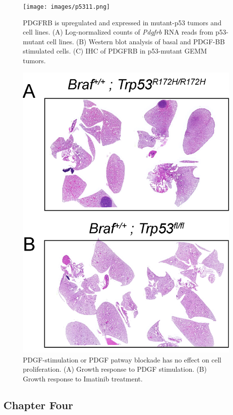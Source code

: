 \begin{figure}
\hypertarget{fig:04}{%
\centering
\texttt{[image: images/p5311.png]}
\caption{PDGFRB is upregulated and expressed in mutant-p53 tumors and cell lines. (A) Log-normalized counts of \emph{Pdgfrb} RNA reads from p53-mutant cell lines. (B) Western blot analysis of basal and PDGF-BB stimulated cells. (C) IHC of PDGFRB in p53-mutant GEMM tumors.}\label{fig:04}
}
\end{figure}

\begin{figure}
\hypertarget{fig:04}{%
\centering
\includegraphics[width=1\textwidth,height=\textheight]{images/p5312.png}
\caption{PDGF-stimulation or PDGF patway blockade has no effect on cell proliferation. (A) Growth response to PDGF stimulation. (B) Growth response to Imatinib treatment.}\label{fig:04}
}
\end{figure}

\hypertarget{chapter-four}{%
\subsection{Chapter Four}\label{chapter-four}}

